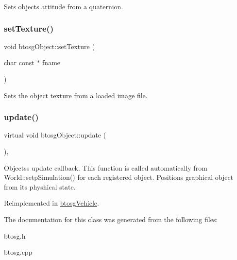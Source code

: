 Sets objects attitude from a quaternion. \mbox{\label{classbtosgObject_aff54acbc7c66811efb0cf2838107a241}} 
\subsubsection{\texorpdfstring{set\+Texture()}{setTexture()}}
{\footnotesize\ttfamily void btosg\+Object\+::set\+Texture (\begin{DoxyParamCaption}\item[{char const $\ast$}]{fname }\end{DoxyParamCaption})}

Sets the object texture from a loaded image file. \mbox{\label{classbtosgObject_a342917817dfde62554f83da8e0d5110b}} 
\subsubsection{\texorpdfstring{update()}{update()}}
{\footnotesize\ttfamily virtual void btosg\+Object\+::update (\begin{DoxyParamCaption}{ }\end{DoxyParamCaption})\hspace{0.3cm}{\ttfamily [inline]}, {\ttfamily [virtual]}}

Objects\textquotesingle{}s update callback. This function is called automatically from World\+::setp\+Simulation() for each registered object. Positions graphical object from its physhical state. 

Reimplemented in \hyperlink{classbtosgVehicle_a5fd0f471df492ac232c9b772a28bd2b9}{btosg\+Vehicle}.



The documentation for this class was generated from the following files\+:\begin{DoxyCompactItemize}
\item 
btosg.\+h\item 
btosg.\+cpp\end{DoxyCompactItemize}
